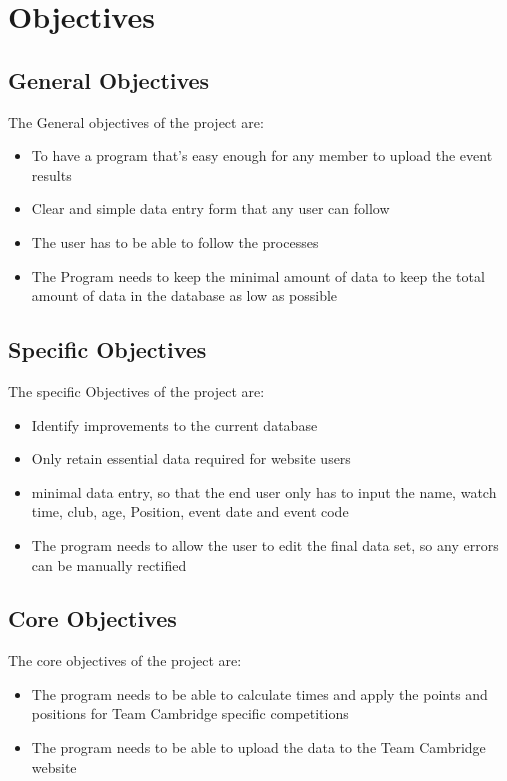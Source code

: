 \section{Objectives}

\subsection{General Objectives}
The General objectives of the project are:
\begin{itemize}
	\item To have a program that's easy enough for any member to upload the event results
	\item Clear and simple data entry form that any user can follow
	\item The user has to be able to follow the processes
	\item The Program needs to keep the minimal amount of data to keep the total amount of data in the database as low as possible
\end{itemize}

\subsection{Specific Objectives}
The specific Objectives of the project are:
\begin{itemize}
	\item Identify improvements to the current database
	\item Only retain essential data required for website users
	\item minimal data entry, so that the end user only has to input the name, watch time, club, age, Position, event date and event code
	\item The program needs to allow the user to edit the final data set, so any errors can be manually rectified
\end{itemize}

\subsection{Core Objectives}


The core objectives of the project are:
\begin{itemize}
	\item The program needs to be able to calculate times and apply the points and positions for Team Cambridge specific competitions
	\item The program needs to be able to upload the data to the Team Cambridge website
\end{itemize}
